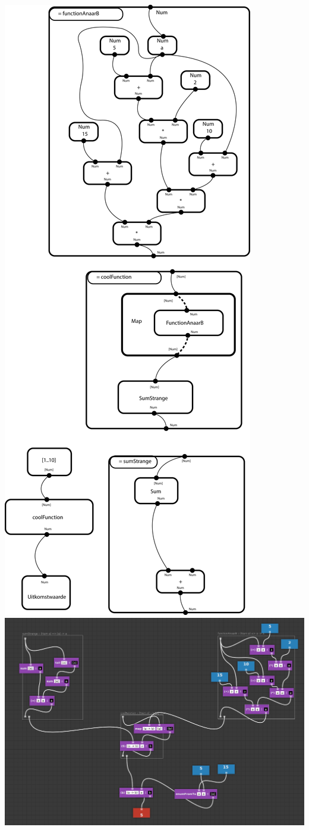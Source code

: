 \includegraphics[]{../Images/voorbeeldprogramma4.png}
\includegraphics[]{../Images/voorbeeldprogramma5.png}
